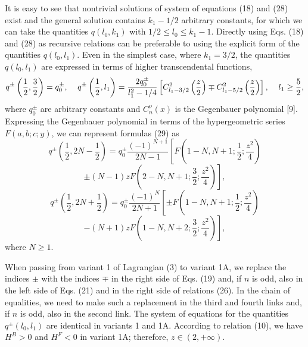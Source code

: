 \documentclass[a4paper,12pt]{article}
\begin{document}
It is easy to see that nontrivial solutions of system of equations (18) and
(28) exist and the general solution contains $k_{1}-1/2$ arbitrary constants, 
for which we can take the quantities  $q(l_{0},k_{1})$ with $1/2 \leq l_{0} 
\leq k_{1}-1$. Directly using Eqs. (18) and (28) as recursive relations can be
preferable to using the explicit form of the quantities $q(l_{0},l_{1})$. Even
in the simplest case, where $k_{1}= 3/2$, the quantities $q(l_{0},l_{1})$ are
expressed in terms of higher transcendental functions,
\begin{equation}
q^{\pm}\left( \frac{1}{2},\frac{3}{2}\right) = q_{0}^{\pm}, \hspace{0.4 cm}
q^{\pm}\left( \frac{1}{2},l_{1}\right) = \frac{2q_{0}^{\pm}}{l_{1}^{2}-1/4}
\left[ C^{2}_{l_{1}-3/2} \left( \frac{z}{2} \right) \mp C^{2}_{l_{1}-5/2} 
\left( \frac{z}{2} \right) \right], \hspace{0.4 cm} l_{1} \geq \frac{5}{2},
\end{equation}
where $q_{0}^{\pm}$ are arbitrary constants and $C^{\nu}_{n}(x)$ is the
Gegenbauer polynomial [9]. Expressing the Gegenbauer polynomial in terms of the
hypergeometric series $F(a,b;c;y)$, we can represent formulas (29) as
$$q^{\pm}\left( \frac{1}{2},2N-\frac{1}{2}\right) =  q_{0}^{\pm} 
\frac{(-1)^{N+1}}{2N-1} \left[ F\left( 1-N,N+1; \frac{1}{2}; 
\frac{z^{2}}{4}\right) \right.$$
\begin{equation}
\left. \pm (N-1)zF\left( 2-N,N+1; \frac{3}{2}; \frac{z^{2}}{4}\right)\right],
\end{equation}
$$q^{\pm}\left( \frac{1}{2},2N+\frac{1}{2}\right) = q_{0}^{\pm} 
\frac{(-1)^{N}}{2N+1} \left[ \pm F\left(1-N,N+1; \frac{1}{2}; 
\frac{z^{2}}{4}\right) \right.$$
\begin{equation}
\left. - (N+1)z F\left( 1-N,N+2; \frac{3}{2}; \frac{z^{2}}{4}\right)\right],
\end{equation}
where $N \geq 1$.

When passing from variant 1 of Lagrangian (3) to variant 1A, we replace the
indices $\pm$ with the indices $\mp$ in the right side of Eqs. (19) and, if $n$ 
is odd, also in the left side of Eqs. (21) and in the right side of relations
(26). In the chain of equalities, we need to make such a replacement in the
third and fourth links and, if $n$ is odd, also in the second link. The system
of equations for the quantities $q^{\pm}(l_{0},l_{1})$ are identical in 
variants 1 and 1A. According to relation (10), we have $H^{B} > 0$ and 
$H^{F} < 0$ in variant 1A; therefore, $z \in (2, +\infty)$.
\end{document}

